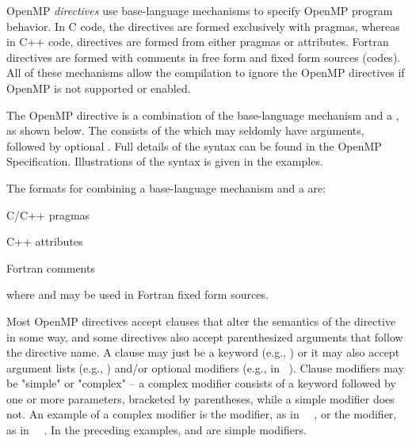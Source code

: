 \label{chap:directive_syntax}

OpenMP \emph{directives} use base-language mechanisms to specify OpenMP program behavior.
In C code, the directives are formed exclusively with pragmas, whereas in C++
code, directives are formed from either pragmas or attributes.
Fortran directives are formed with comments in free form and fixed form sources (codes).
All of these mechanisms allow the compilation to ignore the OpenMP directives if
OpenMP is not supported or enabled.


The OpenMP directive is a combination of the base-language mechanism and a ,
as shown below. The  consists
of the  which may seldomly have arguments, 
followed by optional . Full details of the syntax can be found in the OpenMP Specification.
Illustrations of the syntax is given in the examples.

The formats for combining a base-language mechanism and a  are:

C/C++ pragmas
\begin{indentedcodelist}
 
\end{indentedcodelist}

C++ attributes
\begin{indentedcodelist}
\code{[[omp :: directive(}  \code{)]]}
\code{[[using omp : directive(}  \code{)]]}
\end{indentedcodelist}

Fortran comments
\begin{indentedcodelist}
 
\end{indentedcodelist}

where  and  may be used in Fortran fixed form sources.

Most OpenMP directives accept clauses that alter the semantics of the directive in some way, 
and some directives also accept parenthesized arguments that follow the directive name. 
A clause may just be a keyword (e.g., ) or it may also accept argument lists 
(e.g., ) and/or optional modifiers (e.g.,  in 
~).
Clause modifiers may be "simple" or "complex" -- a complex modifier consists of a 
keyword followed by one or more parameters, bracketed by parentheses, while a simple 
modifier does not. An example of a complex modifier is the  modifier, 
as in ~~, or the  modifier, as in 
~~. 
In the preceding examples,  and  are simple modifiers.








